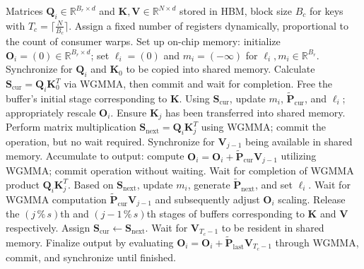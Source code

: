 \begin{enumerate}
\begin{algorithm}[H]
    \caption{\small\label{alg:flash3_wgmma}\textsc{FlashAttention-3} consumer warpgroup forward pass}
    \begin{algorithmic}[1]
      \REQUIRE  Matrices $\mathbf{Q}_i \in \mathbb{R}^{B_r \times d}$ and $\mathbf{K}, \mathbf{V} \in \mathbb{R}^{N \times d}$ stored in HBM, block size $B_c$ for keys with $T_c = \lceil \frac{N}{B_c} \rceil$.
      \STATE Assign a fixed number of registers dynamically, proportional to the count of consumer warps.
      \STATE Set up on-chip memory: initialize $\mathbf{O}_i = (0) \in \mathbb{R}^{B_r \times d}$; set $\ell_i = (0)$ and $m_i = (-\infty)$ for $\ell_i, m_i \in \mathbb{R}^{B_r}$.
      \STATE Synchronize for $\mathbf{Q}_i$ and $\mathbf{K}_0$ to be copied into shared memory.
      \STATE Calculate $\mathbf{S}_{\mathrm{cur}} = \mathbf{Q}_i \mathbf{K}_0^T$ via WGMMA, then commit and wait for completion.
      \STATE Free the buffer’s initial stage corresponding to $\mathbf{K}$.
      \STATE Using $\mathbf{S}_{\mathrm{cur}}$, update $m_{i}$, $\tilde{\mathbf{P}}_{\mathrm{cur}}$, and $\ell_{i}$; appropriately rescale $\mathbf{O}_i$.
        \STATE Ensure $\mathbf{K}_j$ has been transferred into shared memory.
        \label{code:mainloop_start}
        \STATE Perform matrix multiplication $\mathbf{S}_{\mathrm{next}} = \mathbf{Q}_i \mathbf{K}_{j}^T$ using WGMMA; commit the operation, but no wait required. \label{code:first_wgmma}
        \STATE Synchronize for $\mathbf{V}_{j-1}$ being available in shared memory.
        \STATE Accumulate to output: compute $\mathbf{O}_{i} = \mathbf{O}_{i} + \tilde{\mathbf{P}}_{\mathrm{cur}} \mathbf{V}_{j-1}$ utilizing WGMMA; commit operation without waiting. \label{code:second_wgmma}
        \STATE Wait for completion of WGMMA product $\mathbf{Q}_i \mathbf{K}_{j}^T$.
        \STATE Based on $\mathbf{S}_{\mathrm{next}}$, update $m_{i}$, generate $\tilde{\mathbf{P}}_{\mathrm{next}}$, and set $\ell_{i}$. \label{code:softmax}
        \STATE Wait for WGMMA computation $\tilde{\mathbf{P}}_{\mathrm{cur}} \mathbf{V}_{j-1}$ and subsequently adjust $\mathbf{O}_i$ scaling.
        \STATE Release the $(j\,\%\,s)$th and $(j-1\,\%\,s)$th stages of buffers corresponding to $\mathbf{K}$ and $\mathbf{V}$ respectively.
        \STATE Assign $\mathbf{S}_{\mathrm{cur}} \leftarrow \mathbf{S}_{\mathrm{next}}$.
        \label{code:mainloop_end}
      \ENDFOR
      \STATE Wait for $\mathbf{V}_{T_c - 1}$ to be resident in shared memory.
      \STATE Finalize output by evaluating 
      $\mathbf{O}_{i} = \mathbf{O}_{i} + \tilde{\mathbf{P}}_{\mathrm{last}} \mathbf{V}_{T_c - 1}$ through WGMMA, commit, and synchronize until finished.


\end{algorithmic}
\end{algorithm}
\end{enumerate}
